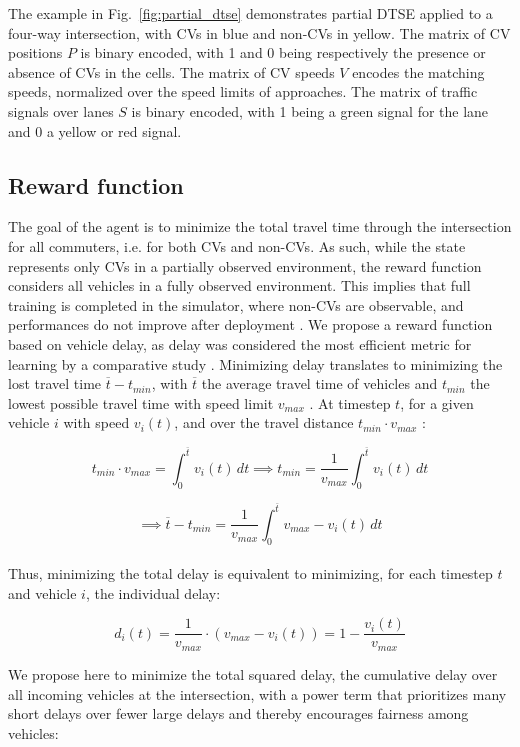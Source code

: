 \documentclass[journal]{IEEEtran}
\begin{document}
The example in Fig.~\ref{fig:partial_dtse} demonstrates partial DTSE applied to a four-way intersection, with CVs in blue and non-CVs in yellow. The matrix of CV positions $P$ is binary encoded, with 1 and 0 being respectively the presence or absence of CVs in the cells. The matrix of CV speeds $V$ encodes the matching speeds, normalized over the speed limits of approaches. The matrix of traffic signals over lanes $S$ is binary encoded, with 1 being a green signal for the lane and 0 a yellow or red signal.

\subsection{Reward function}

The goal of the agent is to minimize the total travel time through the intersection for all commuters, i.e. for both CVs and non-CVs. As such, while the state represents only CVs in a partially observed environment, the reward function considers all vehicles in a fully observed environment. This implies that full training is completed in the simulator, where non-CVs are observable, and performances do not improve after deployment \cite{zhang2020using}. We propose a reward function based on vehicle delay, as delay was considered the most efficient metric for learning by a comparative study \cite{touhbi2017adaptative}. Minimizing delay translates to minimizing the lost travel time $\overline{t} - t_{min}$, with $\overline{t}$ the average travel time of vehicles and $t_{min}$ the lowest possible travel time with speed limit $v_{max}$ \cite{zhang2020using}. At timestep $t$, for a given vehicle $i$ with speed $v_i(t)$, and over the travel distance $t_{min} \cdot v_{max}$ :

\[ t_{min} \cdot v_{max} = \int_{0}^{\overline{t}} v_i(t) \,dt \implies t_{min} = \frac{1}{v_{max}} \int_{0}^{\overline{t}} v_i(t) \,dt \]

\[ \implies \overline{t} - t_{min} = \frac{1}{v_{max}} \int_{0}^{\overline{t}} v_{max} - v_i(t) \,dt \]
\\

Thus, minimizing the total delay is equivalent to minimizing, for each timestep $t$ and vehicle $i$, the individual delay:

\[ d_i(t) = \frac{1}{v_{max}} \cdot ({v_{max}} - v_i(t)) = 1 - \frac{v_i(t)}{v_{max}} \]

We propose here to minimize the total squared delay, the cumulative delay over all incoming vehicles at the intersection, with a power term that prioritizes many short delays over fewer large delays and thereby encourages fairness among vehicles:
\end{document}
